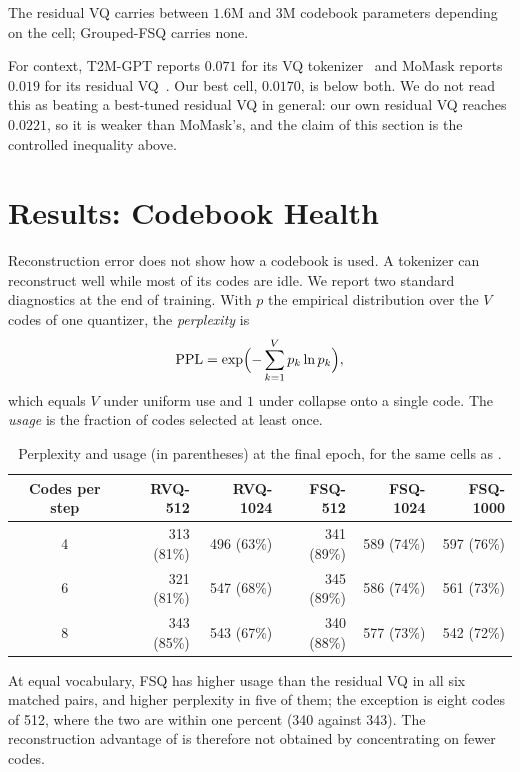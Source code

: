The residual VQ carries between $1.6$M and $3$M codebook parameters depending on the cell; Grouped-FSQ carries none.

For context, T2M-GPT reports $0.071$ for its VQ tokenizer~\cite{zhang2023t2mgpt} and MoMask reports $0.019$ for its residual VQ~\cite{guo2024momask}. Our best cell, $0.0170$, is below both. We do not read this as beating a best-tuned residual VQ in general: our own residual VQ reaches $0.0221$, so it is weaker than MoMask's, and the claim of this section is the controlled inequality above.

\section{Results: Codebook Health}
\label{sec:tok_health}

Reconstruction error does not show how a codebook is used. A tokenizer can reconstruct well while most of its codes are idle. We report two standard diagnostics at the end of training. With $p$ the empirical distribution over the $V$ codes of one quantizer, the \emph{perplexity} is
\begin{equation}
\mathrm{PPL} = \exp\Bigl(-\sum_{k=1}^{V} p_k \ln p_k\Bigr),
\end{equation}
which equals $V$ under uniform use and $1$ under collapse onto a single code. The \emph{usage} is the fraction of codes selected at least once.

\begin{table}[H]
\centering
\caption{Perplexity and usage (in parentheses) at the final epoch, for the same cells as .}
\label{tab:tok_health}
\begin{tabular}{crrrrr}
\toprule
Codes per step & RVQ-512 & RVQ-1024 & FSQ-512 & FSQ-1024 & FSQ-1000 \\
\midrule
4 & 313 (81\%) & 496 (63\%) & 341 (89\%) & 589 (74\%) & 597 (76\%) \\
6 & 321 (81\%) & 547 (68\%) & 345 (89\%) & 586 (74\%) & 561 (73\%) \\
8 & 343 (85\%) & 543 (67\%) & 340 (88\%) & 577 (73\%) & 542 (72\%) \\
\bottomrule
\end{tabular}
\end{table}

At equal vocabulary, FSQ has higher usage than the residual VQ in all six matched pairs, and higher perplexity in five of them; the exception is eight codes of 512, where the two are within one percent (340 against 343). The reconstruction advantage of  is therefore not obtained by concentrating on fewer codes.

